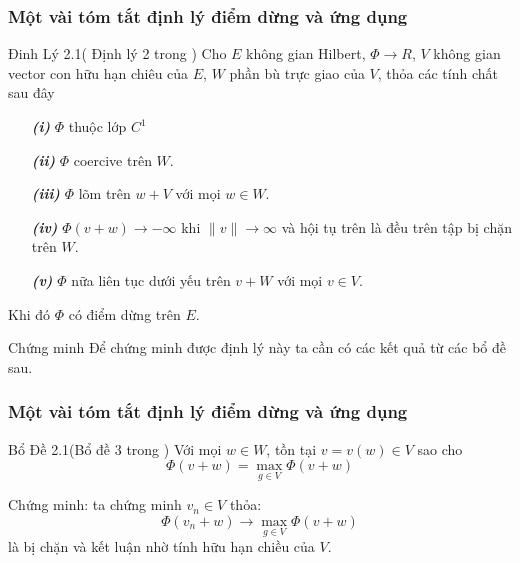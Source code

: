 \documentclass[11pt]{beamer}
\numberwithin{equation}{section}
\theoremstyle{plain}
\theoremstyle{definition}
\theoremstyle{remark}
\begin{document}

\begin{frame}
\frametitle{Một vài tóm tắt định lý điểm dừng và ứng dụng }
\begin{block}{Đinh Lý 2.1( Định lý 2 trong \cite{YJMM})}
 Cho $E$ không gian Hilbert, $\Phi \rightarrow R$, $V$ không gian  vector con hữu hạn chiêu của $E$, $W$ phần bù trực giao của $V$, thỏa các tính chất sau đây
\begin{itemize}
\item[\textbf{\textit{(i)}}] $\Phi$ thuộc lớp $C^1$
\item[\textbf{\textit{(ii)}}] $\Phi$ coercive trên $W$.
\item[\textbf{\textit{(iii)}}] $\Phi$ lõm trên $w+V$ với mọi $w\in W$.
\item[\textbf{\textit{(iv)}}] $\Phi(v+w) \rightarrow -\infty$ khi $\|v\| \rightarrow \infty$ và hội tụ trên là đều trên tập bị chặn trên $W$.
\item[\textbf{\textit{(v)}}] $\Phi$ nữa liên tục dưới yếu trên $v+W$ với mọi $v \in V$.
\end{itemize}
Khi đó $\Phi$ có điểm dừng trên $E$.
\end{block}
\begin{block}{Chứng minh }
Để chứng minh được định lý này ta cần có các kết quả từ các bổ đề sau.
\end{block}
\end{frame}


\begin{frame}
\frametitle{Một vài tóm tắt định lý điểm dừng và ứng dụng }
\begin{block}{Bổ Đề 2.1(Bổ đề 3 trong \cite{YJMM})}
  Với mọi $w\in W$, tồn tại $v=v(w)\in V$ sao cho $$\Phi \left ( v+w \right )=\max_{g\in V}\Phi \left ( v+w \right )$$ 
\end{block}
Chứng minh: ta chứng minh $v_n\in V$ thỏa: $$\Phi \left ( v_n+w \right )\rightarrow \max_{g\in V}\Phi \left ( v+w \right )$$ là bị chặn và kết luận nhờ tính hữu hạn chiều của $V$.

\end{frame}
\end{document}
